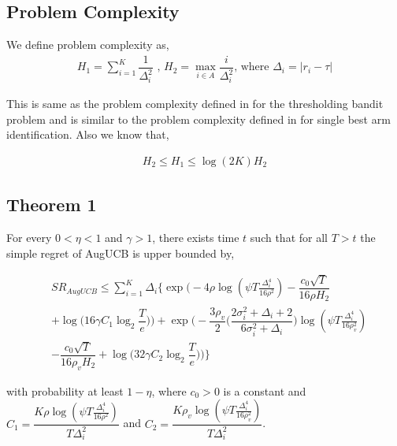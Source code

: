 

\subsection{Problem Complexity}

We define problem complexity as,
\begin{align*}
H_{1} = \sum_{i=1}^{K}\dfrac{1}{\Delta_{i}^{2}} \text{ ,   } H_{2}=\max_{i\in A}\dfrac{i}{{\Delta_{i}^{2}}} \text{, where } \Delta_{i}=|r_{i}-\tau|
\end{align*}

This is same as the problem complexity defined in \cite{locatelli2016optimal} for the thresholding bandit problem and is similar to the problem complexity defined in \cite{audibert2010best} for single best arm identification. Also we know that,

\begin{align*}
H_{2}\leq H_{1}\leq \log(2K)H_{2}
\end{align*}


\subsection{Theorem 1}

\begin{theorem}
\label{Result:Theorem:1}

For every $0<\eta <1$ and $\gamma > 1$, there exists time $t$ such that for all $T>t$ the simple regret of AugUCB is upper bounded by,
\begin{small}
\begin{align*}
& SR_{AugUCB} \leq \sum_{i=1}^{K} \Delta_{i}\bigg\lbrace \exp\bigg(-4\rho\log (\psi T\frac{\Delta_{i}^{4}}{16\rho^{2}})-\dfrac{c_{0}\sqrt{T}}{16\rho H_{2}}\\
& + \log \big( 16\gamma C_1\log_{2}\dfrac{T}{e} \big) \bigg) + \exp\bigg(- \dfrac{3\rho_v}{2} \bigg(\dfrac{2\sigma_{i}^{2}+\Delta_{i}+2}{6\sigma_{i}^{2}+\Delta_{i}}\bigg)\log(\psi T\frac{\Delta_{i}^{4}}{16\rho_{v}^{2}})\\
& -\dfrac{c_{0}\sqrt{T}}{16\rho_v H_{2}} + \log\big ( 32\gamma C_2\log_{2}\dfrac{T}{e} \big)  \bigg)\bigg\rbrace
\end{align*}
\end{small}
with probability at least $1-\eta$, where $c_{0}>0$ is a constant and $C_1=\dfrac{K\rho\log (\psi T \frac{\Delta_{i}^{4}}{16\rho^{2}})}{T\Delta_{i}^{2}}$ and $C_2= \dfrac{K\rho_v\log (\psi T \frac{\Delta_{i}^{4}}{16\rho_{v}^{2}})}{T\Delta_{i}^{2}}$.

\end{theorem}


